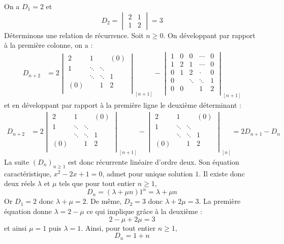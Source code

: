 \documentclass[a4paper,10pt]{report}
\begin{document}
\corr On a $D_1=2$ et 
$$ D_2 = \begin{vmatrix}
2 & 1 \\
1 & 2 
\end{vmatrix} = 3$$
Déterminons une relation de récurrence. Soit $n \geq 0$. On développant par rapport à la première colonne, on a :
\begin{align*}
D_{n+2} & = 2  \begin{vmatrix}
        2 & 1 & {} & {(0)} \\
        1 & \ddots & \ddots & {} \\
        {} & \ddots & \ddots & 1 \\
        {(0)} & {} & 1 & 2 \\
    \end{vmatrix}_{[n+1]} -  \begin{vmatrix}
        1 & 0 & 0 & \cdots & 0 \\
        1 & 2 & 1 & \cdots & 0  \\
        0 & 1 & 2 & \cdot & 0 \\
        0 & &\ddots  & \ddots & 1 \\
        0 & 0 & & 1 & 2 \\
    \end{vmatrix}_{[n+1]}
\end{align*}
et en développant par rapport à la première ligne le deuxième déterminant :
\begin{align*}
D_{n+2} & = 2  \begin{vmatrix}
        2 & 1 & {} & {(0)} \\
        1 & \ddots & \ddots & {} \\
        {} & \ddots & \ddots & 1 \\
        {(0)} & {} & 1 & 2 \\
    \end{vmatrix}_{[n+1]} - \begin{vmatrix}
        2 & 1 & {} & {(0)} \\
        1 & \ddots & \ddots & {} \\
        {} & \ddots & \ddots & 1 \\
        {(0)} & {} & 1 & 2 \\
    \end{vmatrix}_{[n]}  = 2 D_{n+1} - D_n 
\end{align*}
La suite $(D_n)_{n \geq 1}$ est donc récurrente linéaire d'ordre deux. Son équation caractéristique, $x^2-2x+1=0$, admet pour unique solution $1$. Il existe donc deux réels $\lambda$ et $\mu$ tels que pour tout entier $n \geq 1$,
$$ D_n = (\lambda+ \mu n) 1^n = \lambda + \mu n$$
Or $D_1=2$ donc $\lambda+\mu =2$. De même, $D_2=3$ donc $\lambda+ 2 \mu = 3$. La première équation donne $\lambda = 2- \mu$ ce qui implique grâce à la deuxième :
$$  2- \mu + 2 \mu = 3$$
et ainsi $ \mu =1$ puis $\lambda=1$. Ainsi, pour tout entier $n \geq 1$,
$$ D_n = 1+n$$
\end{document}
